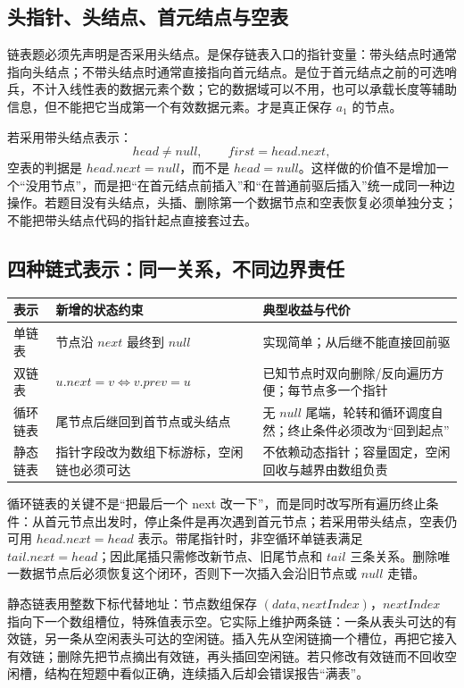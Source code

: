 \documentclass[UTF8,fontset=none,11pt,a4paper]{ctexart}
\begin{document}
\subsection{头指针、头结点、首元结点与空表}
链表题必须先声明是否采用头结点。是保存链表入口的指针变量：带头结点时通常指向头结点；不带头结点时通常直接指向首元结点。是位于首元结点之前的可选哨兵，不计入线性表的数据元素个数；它的数据域可以不用，也可以承载长度等辅助信息，但不能把它当成第一个有效数据元素。才是真正保存 $a_1$ 的节点。

若采用带头结点表示：
\[
head\neq null,\qquad first=head.next,
\]
空表的判据是 $head.next=null$，而不是 $head=null$。这样做的价值不是增加一个“没用节点”，而是把“在首元结点前插入”和“在普通前驱后插入”统一成同一种边操作。若题目没有头结点，头插、删除第一个数据节点和空表恢复必须单独分支；不能把带头结点代码的指针起点直接套过去。

\subsection{四种链式表示：同一关系，不同边界责任}
\begin{center}\small
\begin{tabularx}{\linewidth}{L{2.2cm}YY}
\toprule
表示 & 新增的状态约束 & 典型收益与代价\\
\midrule
单链表 & 节点沿 $next$ 最终到 $null$ & 实现简单；从后继不能直接回前驱\\
双链表 & $u.next=v\Leftrightarrow v.prev=u$ & 已知节点时双向删除/反向遍历方便；每节点多一个指针\\
循环链表 & 尾节点后继回到首节点或头结点 & 无 $null$ 尾端，轮转和循环调度自然；终止条件必须改为“回到起点”\\
静态链表 & 指针字段改为数组下标游标，空闲链也必须可达 & 不依赖动态指针；容量固定，空闲回收与越界由数组负责\\
\bottomrule
\end{tabularx}\end{center}

循环链表的关键不是“把最后一个 next 改一下”，而是同时改写所有遍历终止条件：从首元节点出发时，停止条件是再次遇到首元节点；若采用带头结点，空表仍可用 $head.next=head$ 表示。带尾指针时，非空循环单链表满足 $tail.next=head$；因此尾插只需修改新节点、旧尾节点和 $tail$ 三条关系。删除唯一数据节点后必须恢复这个闭环，否则下一次插入会沿旧节点或 $null$ 走错。

静态链表用整数下标代替地址：节点数组保存 $(data,nextIndex)$，$nextIndex$ 指向下一个数组槽位，特殊值表示空。它实际上维护两条链：一条从表头可达的有效链，另一条从空闲表头可达的空闲链。插入先从空闲链摘一个槽位，再把它接入有效链；删除先把节点摘出有效链，再头插回空闲链。若只修改有效链而不回收空闲槽，结构在短题中看似正确，连续插入后却会错误报告“满表”。
\end{document}
